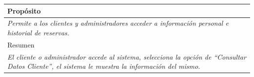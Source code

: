 \begin{table}[H]
\begin{tabular}{|llllllll|}
    \multicolumn{8}{|l|}{Prop\'osito}                                                                                                                                                                                                                                         \\ \hline
    \multicolumn{8}{|p{15cm}|}{{\color[HTML]{808080} \textit{Permite a los clientes y administradores acceder a informaci\'on personal e historial de reservas.}}}                                                                                                                                                                                       \\ \hline
    \multicolumn{8}{|l|}{Resumen}                                                                                                                                                                                                                                           \\ \hline
    \multicolumn{8}{|p{15cm}|}{{\color[HTML]{808080} \textit{El cliente o administrador accede al sistema, selecciona la opci\'on de ``Consultar Datos Cliente'', el sistema le muestra la informaci\'on del mismo.}}} \\ \hline
    \end{tabular}
\end{table}


